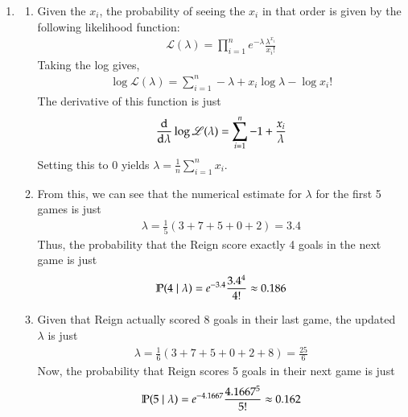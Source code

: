 \documentclass[12pt]{article}
\theoremstyle{definitionstyle}
\renewcommand{\P}{\mathbb P\qty}
\begin{document}
\begin{enumerate}[leftmargin=\labelsep]
        \item 
        \begin{enumerate}
            \item Given the $x_i$, the probability of seeing the $x_i$ in that order is given by the following likelihood function:
            \begin{align*}
                \mathscr{L}(\lambda) = \prod_{i=1}^n e^{-\lambda} \frac{\lambda^{x_i}}{x_i!}
            \end{align*}
            Taking the log gives,
            \begin{align*}
                \log \mathscr{L}(\lambda) = \sum_{i=1}^n -\lambda + x_i \log \lambda - \log x_i!
            \end{align*}
            The derivative of this function is just
            \begin{align*}
                \dv{\lambda} \log \mathscr{L}(\lambda) = \sum_{i=1}^n -1 + \frac{x_i}{\lambda}
            \end{align*}
            Setting this to 0 yields $\lambda = \frac{1}{n} \sum_{i=1}^n x_i$.

            \item From this, we can see that the numerical estimate for $\lambda$ for the first 5 games is just
            \begin{align*}
                \lambda = \frac15 (3+7+5+0+2) = 3.4
            \end{align*}
            Thus, the probability that the Reign score exactly 4 goals in the next game is just
            \begin{align*}
                \P(4 \mid \lambda) = e^{-3.4}\frac{3.4^4}{4!} \approx 0.186
            \end{align*}

            \item Given that Reign actually scored 8 goals in their last game, the updated $\lambda$ is just
            \begin{align*}
                \lambda = \frac16 (3+7+5+0+2+8) = \frac{25}{6}
            \end{align*}
            Now, the probability that Reign scores 5 goals in their next game is just
            \begin{align*}
                \P(5 \mid \lambda) = e^{-4.1667}\frac{4.1667^5}{5!} \approx 0.162
            \end{align*}
        \end{enumerate}


\end{enumerate}
\end{document}
